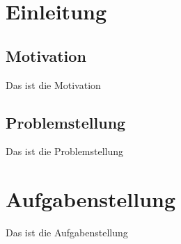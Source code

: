 


\chapter{Einleitung}
\section*{Motivation}
Das ist die Motivation

\section*{Problemstellung}
Das ist die Problemstellung


\chapter{Aufgabenstellung}
Das ist die Aufgabenstellung

